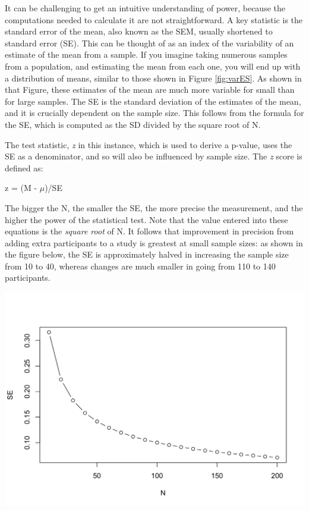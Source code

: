 \begin{tcolorbox}[enhanced,breakable,colback=Black!5!Lightgray,colframe=black!75!black,coltitle=white,title=Standard error of the mean]
It can be challenging to get an intuitive understanding of power, because the computations needed to calculate it are not straightforward. A key statistic is the standard error of the mean, also known as the SEM, usually shortened to standard error (SE). This can be thought of as an index of the variability of an estimate of the mean from a sample. If you imagine taking numerous samples from a population, and estimating the mean from each one, you will end up with a distribution of means, similar to those shown in Figure \ref{fig:varES}. As shown in that Figure, these estimates of the mean are much more variable for small than for large samples. The SE is the standard deviation of the estimates of the mean, and it is crucially dependent on the sample size.
This follows from the formula for the SE, which is computed as the SD divided by the square root of N.

The test statistic, \emph{z} in this instance, which is used to derive a p-value, uses the SE as a denominator, and so will also be influenced by sample size. The \emph{z} score is defined as:

z = (M - \(\mu\))/SE

The bigger the N, the smaller the SE, the more precise the measurement, and the higher the power of the statistical test. Note that the value entered into these equations is the \emph{square root} of N. It follows that improvement in precision from adding extra participants to a study is greatest at small sample sizes: as shown in the figure below, the SE is approximately halved in increasing the sample size from 10 to 40, whereas changes are much smaller in going from 110 to 140 participants.

\includegraphics[width=0.6\linewidth]{images_bw/demoSE}\label{SEMbyN}
\end{tcolorbox}

